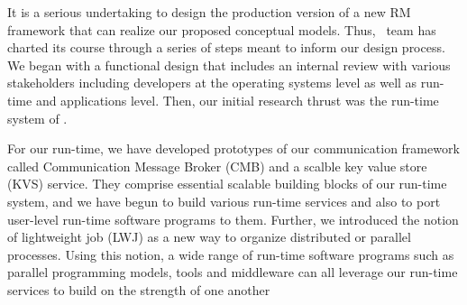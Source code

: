 It is a serious undertaking 
to design the production version of a new 
RM framework that can realize our proposed conceptual models.
Thus, \flux\ team has charted its course through a series of steps
meant to inform our design process. 
We began with a functional design that includes an
internal review with various stakeholders including 
developers at the operating systems level
as well as run-time and applications level.
Then, our initial research thrust was the run-time system of \flux.

%
For our run-time, we have developed prototypes of our communication framework 
called Communication Message Broker (CMB) 
and a scalble key value store (KVS) service.
They comprise essential scalable building blocks of our run-time system, 
and we have begun to build various run-time services and also 
to port user-level run-time software programs to them.
Further, we introduced the notion of lightweight 
job (LWJ) as a new way to organize distributed or parallel processes.
Using this notion, a wide range of run-time software
programs such as parallel programming models,
tools and middleware can all leverage our run-time services 
to build on the strength of one another 

\ifcomments
{}
\fi
